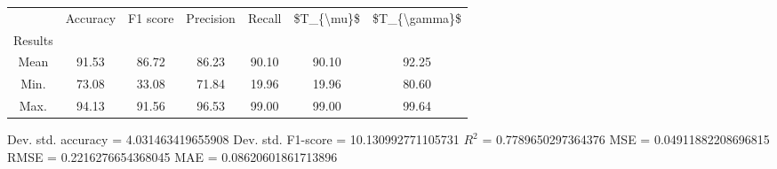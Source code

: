 \begin{tabular}{|c|c|c|c|c|c|c|}
\toprule
{} &  Accuracy &  F1 score &  Precision &  Recall &  \$T\_\{\textbackslash mu\}\$ &  \$T\_\{\textbackslash gamma\}\$ \\
Results &           &           &            &         &            &               \\
\hline
Mean    &     91.53 &     86.72 &      86.23 &   90.10 &      90.10 &         92.25 \\
Min.    &     73.08 &     33.08 &      71.84 &   19.96 &      19.96 &         80.60 \\
Max.    &     94.13 &     91.56 &      96.53 &   99.00 &      99.00 &         99.64 \\
\bottomrule
\end{tabular}

 Dev. std. accuracy = 4.031463419655908
 Dev. std. F1-score = 10.130992771105731
 $R^2$ = 0.7789650297364376
 MSE = 0.04911882208696815
 RMSE = 0.2216276654368045
 MAE = 0.08620601861713896